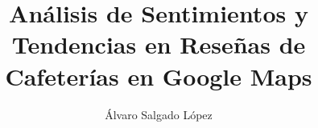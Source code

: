 \documentclass[journal]{IEEEtran}
\begin{document}
%
\title{Análisis de Sentimientos y Tendencias en Reseñas de Cafeterías en Google Maps}


\author{Álvaro Salgado López}

% 
%














\maketitle
\end{document}
